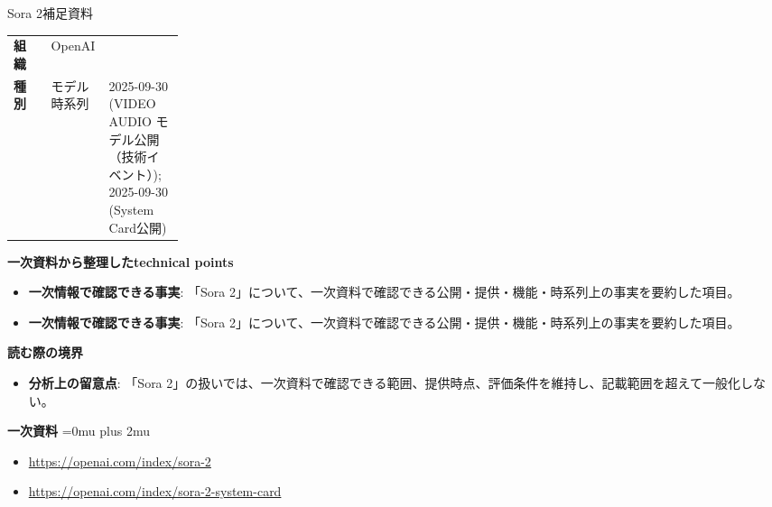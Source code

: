 \begin{technicalnote}{Sora 2}{補足資料}
\begingroup
\begin{tabularx}{\linewidth}{@{}>{\bfseries}p{0.22\linewidth}X@{}}
組織 & OpenAI \\
種別 & モデル
時系列 & 2025-09-30 (VIDEO AUDIO モデル公開（技術イベント）); 2025-09-30 (System Card公開) \\
\end{tabularx}
\smallskip
{\bfseries 一次資料から整理したtechnical points}
\begin{itemize}[leftmargin=1.5em,itemsep=0.35em]
\item \textbf{一次情報で確認できる事実}: 「Sora 2」について、一次資料で確認できる公開・提供・機能・時系列上の事実を要約した項目。
\item \textbf{一次情報で確認できる事実}: 「Sora 2」について、一次資料で確認できる公開・提供・機能・時系列上の事実を要約した項目。
\end{itemize}
\begin{minipage}{\linewidth}
{\bfseries 読む際の境界}
\begin{itemize}[leftmargin=1.5em,itemsep=0.35em]
\item \textbf{分析上の留意点}: 「Sora 2」の扱いでは、一次資料で確認できる範囲、提供時点、評価条件を維持し、記載範囲を超えて一般化しない。
\end{itemize}
\begin{samepage}
{\bfseries 一次資料}
\begingroup\sloppy
\Urlmuskip=0mu plus 2mu\relax
\begin{itemize}[leftmargin=1.5em,itemsep=0.25em]
\item {\scriptsize\url{https://openai.com/index/sora-2}}
\item {\scriptsize\url{https://openai.com/index/sora-2-system-card}}
\end{itemize}
\endgroup
\end{samepage}
\end{minipage}
\endgroup
\end{technicalnote}
\medskip

